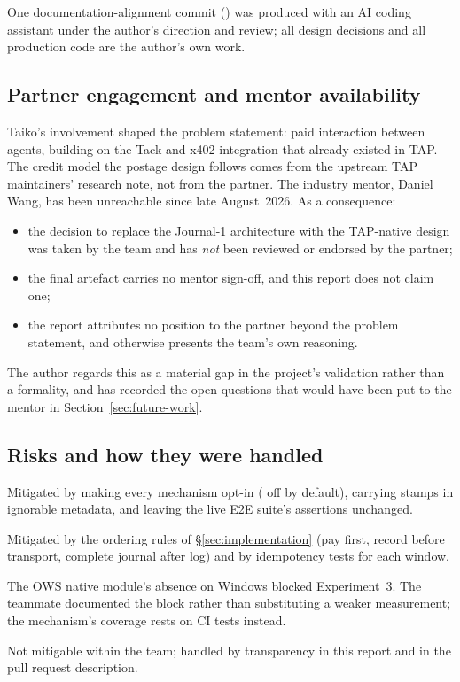 One documentation-alignment commit () was produced with an AI coding
assistant under the author's direction and review; all design decisions and all
production code are the author's own work.

\subsection{Partner engagement and mentor availability}

Taiko's involvement shaped the problem statement: paid interaction between agents,
building on the Tack and x402 integration that already existed in TAP. The credit model
the postage design follows comes from the upstream TAP maintainers' research note, not
from the partner. The industry mentor, Daniel Wang, has been unreachable since late
August~2026. As a consequence:

\begin{itemize}
  \item the decision to replace the Journal-1 architecture with the TAP-native design was
        taken by the team and has \emph{not} been reviewed or endorsed by the partner;
  \item the final artefact carries no mentor sign-off, and this report does not claim one;
  \item the report attributes no position to the partner beyond the problem statement, and
        otherwise presents the team's own reasoning.
\end{itemize}

The author regards this as a material gap in the project's validation rather than a
formality, and has recorded the open questions that would have been put to the mentor in
Section~\ref{sec:future-work}.

\subsection{Risks and how they were handled}

\begin{description}[style=nextline,leftmargin=1.2em]
  \item[Breaking existing users.] Mitigated by making every mechanism opt-in
        ( off by default), carrying stamps in ignorable metadata,
        and leaving the live E2E suite's assertions unchanged.
  \item[Money-moving code with crash windows.] Mitigated by the ordering rules of
        \S\ref{sec:implementation} (pay first, record before transport, complete journal
        after log) and by idempotency tests for each window.
  \item[Platform dependency in evaluation.] The OWS native module's absence on Windows
        blocked Experiment~3. The teammate documented the block rather than substituting a
        weaker measurement; the mechanism's coverage rests on CI tests instead.
  \item[Loss of mentor contact.] Not mitigable within the team; handled by transparency
        in this report and in the pull request description.
\end{description}
